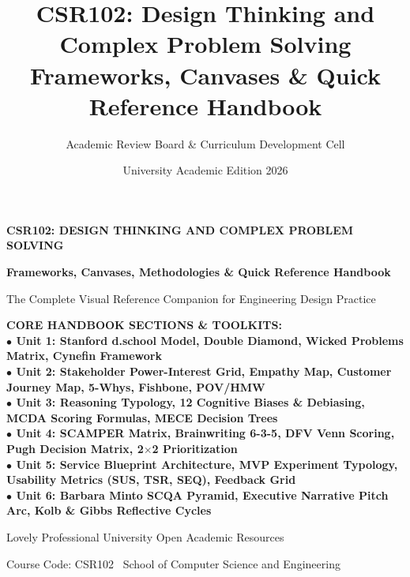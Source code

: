 \documentclass[a4paper,11pt,oneside,openany]{book}
\title{CSR102: Design Thinking and Complex Problem Solving\\Frameworks, Canvases \& Quick Reference Handbook}
\author{Academic Review Board \& Curriculum Development Cell}
\date{University Academic Edition 2026}
\begin{document}
\frontmatter

\begin{titlepage}
    \centering
    \vspace*{2cm}
    {\Huge\bfseries\color{LPUNavy} CSR102: DESIGN THINKING AND COMPLEX PROBLEM SOLVING\par}
    \vspace{0.8cm}
    {\Large\bfseries\color{LPUOrange} Frameworks, Canvases, Methodologies \& Quick Reference Handbook\par}
    \vspace{0.5cm}
    {\large The Complete Visual Reference Companion for Engineering Design Practice\par}
    \vspace{2cm}
    \begin{tcolorbox}[colback=FormulaBg,colframe=LPUNavy,arc=3mm,boxrule=1pt,width=0.88\textwidth]
        \centering\bfseries\color{LPUNavy}
        CORE HANDBOOK SECTIONS \& TOOLKITS:\\[2mm]
        \normalfont\small
        $\bullet$ \textbf{Unit 1:} Stanford d.school Model, Double Diamond, Wicked Problems Matrix, Cynefin Framework\\[1mm]
        $\bullet$ \textbf{Unit 2:} Stakeholder Power-Interest Grid, Empathy Map, Customer Journey Map, 5-Whys, Fishbone, POV/HMW\\[1mm]
        $\bullet$ \textbf{Unit 3:} Reasoning Typology, 12 Cognitive Biases \& Debiasing, MCDA Scoring Formulas, MECE Decision Trees\\[1mm]
        $\bullet$ \textbf{Unit 4:} SCAMPER Matrix, Brainwriting 6-3-5, DFV Venn Scoring, Pugh Decision Matrix, 2$\times$2 Prioritization\\[1mm]
        $\bullet$ \textbf{Unit 5:} Service Blueprint Architecture, MVP Experiment Typology, Usability Metrics (SUS, TSR, SEQ), Feedback Grid\\[1mm]
        $\bullet$ \textbf{Unit 6:} Barbara Minto SCQA Pyramid, Executive Narrative Pitch Arc, Kolb \& Gibbs Reflective Cycles
    \end{tcolorbox}
    \vfill
    {\large Lovely Professional University Open Academic Resources\par}
    {\small Course Code: CSR102 \textbullet\ School of Computer Science and Engineering\par}
    \vspace*{1.5cm}
\end{titlepage}

\tableofcontents
\newpage

\mainmatter







\end{document}
